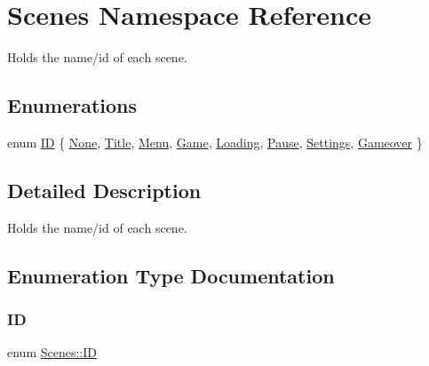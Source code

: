 \hypertarget{namespace_scenes}{}\section{Scenes Namespace Reference}
\label{namespace_scenes}


Holds the name/id of each scene.  


\subsection*{Enumerations}
\begin{DoxyCompactItemize}
\item 
enum \hyperlink{namespace_scenes_a0ad7ab6856b1d77d498e3a251f6bb275}{ID} \{ \newline
\hyperlink{namespace_scenes_a0ad7ab6856b1d77d498e3a251f6bb275a62ed6cc2cc350c0b2f007bba07e0aac6}{None}, 
\hyperlink{namespace_scenes_a0ad7ab6856b1d77d498e3a251f6bb275a777d5475dda0030fdd34a9f736b5891a}{Title}, 
\hyperlink{namespace_scenes_a0ad7ab6856b1d77d498e3a251f6bb275a8c6d665468f36f79d9f0b1d02ec46b74}{Menu}, 
\hyperlink{namespace_scenes_a0ad7ab6856b1d77d498e3a251f6bb275a1c09bc977521c21c5bd955eca43c24f1}{Game}, 
\newline
\hyperlink{namespace_scenes_a0ad7ab6856b1d77d498e3a251f6bb275aa64f4adb0e245eb77f79e2cf3c2c10e7}{Loading}, 
\hyperlink{namespace_scenes_a0ad7ab6856b1d77d498e3a251f6bb275a554bcf6b884325cfc3097b9d12f3d97b}{Pause}, 
\hyperlink{namespace_scenes_a0ad7ab6856b1d77d498e3a251f6bb275a81c375e87af8f99a546d728ce60e4620}{Settings}, 
\hyperlink{namespace_scenes_a0ad7ab6856b1d77d498e3a251f6bb275aca2e7abcafce28f8ca6e764360a04047}{Gameover}
 \}
\end{DoxyCompactItemize}


\subsection{Detailed Description}
Holds the name/id of each scene. 



\subsection{Enumeration Type Documentation}
\mbox{\label{namespace_scenes_a0ad7ab6856b1d77d498e3a251f6bb275}} 
\subsubsection{\texorpdfstring{ID}{ID}}
{\footnotesize\ttfamily enum \hyperlink{namespace_scenes_a0ad7ab6856b1d77d498e3a251f6bb275}{Scenes\+::\+ID}}

